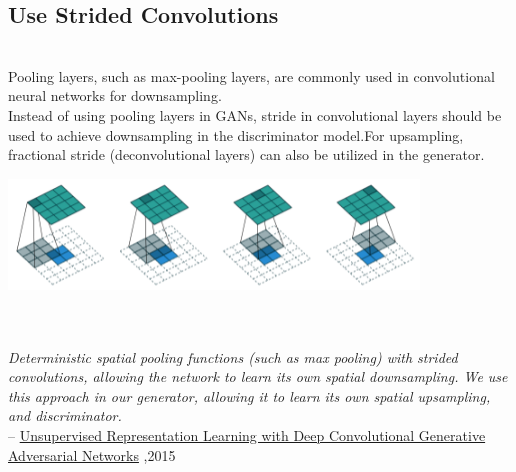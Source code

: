 \documentclass[14pt]{article}
\begin{document}
\subsection{Use Strided Convolutions}
\\
Pooling layers, such as max-pooling layers, are commonly used in convolutional neural networks for downsampling.\\
Instead of using pooling layers in GANs, stride in convolutional layers should be used to achieve downsampling in the discriminator model.For upsampling, fractional stride (deconvolutional layers) can also be utilized in the generator.
\\
\begin{center}
    \includegraphics[width = 12 cm ]{16.png}
\end{center}
\\ \\
\hspace*{1cm} \textit{Deterministic spatial pooling functions (such as max pooling) with strided convolutions, allowing the network to learn its own spatial downsampling. We use this approach in our generator, allowing it to learn its own spatial upsampling, and discriminator.}
\\

\hspace*{4cm} --
\hyperlink{https://arxiv.org/abs/1511.06434}{Unsupervised Representation Learning with Deep Convolutional Generative Adversarial Networks} ,2015
\\
\end{document}
